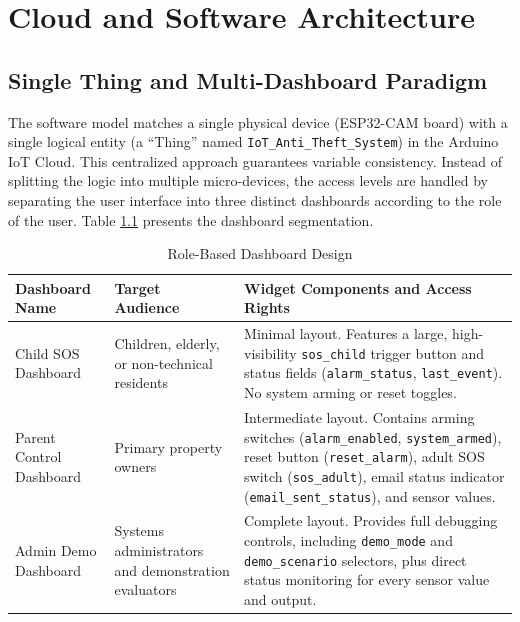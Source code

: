 \documentclass[11pt,a4paper]{report}
\begin{document}
\chapter{Cloud and Software Architecture}
\section{Single Thing and Multi-Dashboard Paradigm}
The software model matches a single physical device (ESP32-CAM board) with a single logical entity (a ``Thing'' named \texttt{IoT\_Anti\_Theft\_System}) in the Arduino IoT Cloud. This centralized approach guarantees variable consistency. Instead of splitting the logic into multiple micro-devices, the access levels are handled by separating the user interface into three distinct dashboards according to the role of the user. Table \ref{tab:dashboards} presents the dashboard segmentation.
\begin{table}[H]
\centering
\caption{Role-Based Dashboard Design}
\label{tab:dashboards}
\begin{tabular}{lp{4cm}p{7cm}}
    \toprule
    \textbf{Dashboard Name} & \textbf{Target Audience} & \textbf{Widget Components and Access Rights} \\
    \midrule
    Child SOS Dashboard & Children, elderly, or non-technical residents & Minimal layout. Features a large, high-visibility \texttt{sos\_child} trigger button and status fields (\texttt{alarm\_status}, \texttt{last\_event}). No system arming or reset toggles. \\
    Parent Control Dashboard & Primary property owners & Intermediate layout. Contains arming switches (\texttt{alarm\_enabled}, \texttt{system\_armed}), reset button (\texttt{reset\_alarm}), adult SOS switch (\texttt{sos\_adult}), email status indicator (\texttt{email\_sent\_status}), and sensor values. \\
    Admin Demo Dashboard & Systems administrators and demonstration evaluators & Complete layout. Provides full debugging controls, including \texttt{demo\_mode} and \texttt{demo\_scenario} selectors, plus direct status monitoring for every sensor value and output. \\
    \bottomrule
\end{tabular}
\end{table}
\end{document}
